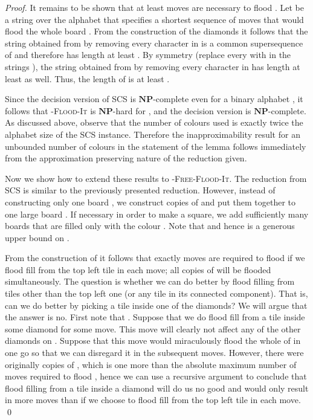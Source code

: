 \documentclass[a4paper,11pt]{llncs}
\newcounter{l}
\newcommand{\NPtime}{\ensuremath{\mathbf{NP}}}
\newcommand{\Coloroid}[1]{-\textsc{Flood-It}}
\newcommand{\ColoroidFree}[1]{-\textsc{Free-Flood-It}}
\newcommand{\SCS}{\textsc{SCS}}
\newcommand{\recdim}[2]{}
\begin{document}
\begin{proof}
    It remains to be shown that at least  moves are necessary to flood . Let  be a string over the alphabet  that specifies a shortest sequence of moves that would flood the whole board . From the construction of the diamonds  it follows that the string obtained from  by removing every character in  is a common supersequence of  and therefore has length at least . By symmetry (replace every  with  in the strings ), the string obtained from  by removing every character in  has length at least  as well. Thus, the length of  is at least .

    Since the decision version of \SCS{} is \NPtime-complete even for a binary alphabet , it follows that \Coloroid{c} is \NPtime-hard for , and the decision version is \NPtime-complete.  As discussed above, observe that the number of colours used is exactly twice the alphabet size of the \SCS{} instance. Therefore the inapproximability result for an unbounded number of colours in the statement of the lemma follows immediately from the approximation preserving nature of the reduction given.

    Now we show how to extend these results to \ColoroidFree{c}. The reduction from \SCS{} is similar to the previously presented reduction. However, instead of constructing only one board , we construct  copies of  and put them together to one large \recdim{n'}{n'} board . If necessary in order to make  a square, we add sufficiently many \recdim{n}{n} boards that are filled only with the colour . Note that  and hence  is a generous upper bound on .

    From the construction of  it follows that exactly  moves are required to flood  if we flood fill from the top left tile in each move; all copies of  will be flooded simultaneously. The question is whether we can do better by flood filling from tiles other than the top left one (or any tile in its connected component). That is, can we do better by picking a tile inside one of the diamonds? We will argue that the answer is no. First note that . Suppose that we do flood fill from a tile inside some diamond  for some move. This move will clearly not affect any of the other diamonds on . Suppose that this move would miraculously flood the whole of  in one go so that we can disregard it in the subsequent moves. However, there were originally  copies of , which is one more than the absolute maximum number of moves required to flood , hence we can use a recursive argument to conclude that flood filling from a tile inside a diamond will do us no good and would only result in more moves than if we choose to flood fill from the top left tile in each move.
    \qed
\end{proof}
\end{document}

